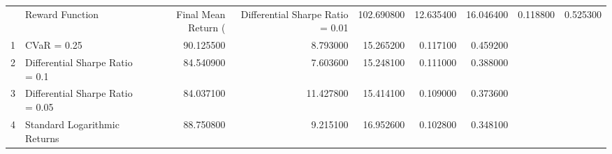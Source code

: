 \begin{tabular}{llrrrrr}
\toprule
 & Reward Function & Final Mean Return (%
 & Differential Sharpe Ratio = 0.01 & 102.690800 & 12.635400 & 16.046400 & 0.118800 & 0.525300 \\
1 & CVaR = 0.25 & 90.125500 & 8.793000 & 15.265200 & 0.117100 & 0.459200 \\
2 & Differential Sharpe Ratio = 0.1 & 84.540900 & 7.603600 & 15.248100 & 0.111000 & 0.388000 \\
3 & Differential Sharpe Ratio = 0.05 & 84.037100 & 11.427800 & 15.414100 & 0.109000 & 0.373600 \\
4 & Standard Logarithmic Returns & 88.750800 & 9.215100 & 16.952600 & 0.102800 & 0.348100 \\
\bottomrule
\end{tabular}
